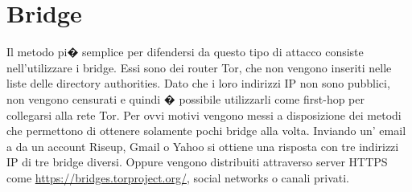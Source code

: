 \section{Bridge}
Il metodo pi� semplice per difendersi da questo tipo di attacco consiste nell'utilizzare i bridge. Essi sono dei router Tor, che non vengono inseriti nelle liste delle directory authorities. Dato che i loro indirizzi IP non sono pubblici, non vengono censurati e quindi � possibile utilizzarli come first-hop per collegarsi alla rete Tor. Per ovvi motivi vengono messi a disposizione dei metodi che permettono di ottenere solamente pochi bridge alla volta. Inviando un' email a  da un account Riseup, Gmail o Yahoo si ottiene una risposta con tre indirizzi IP di tre bridge diversi. Oppure vengono distribuiti attraverso server HTTPS come \url{https://bridges.torproject.org/}, social networks o canali privati. 

